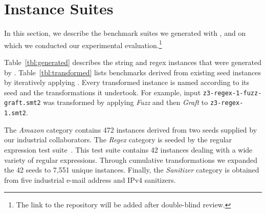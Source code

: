 \section{Instance Suites}
\label{sec:suites}

In this section, we describe the benchmark suites we generated
with \fuzzer{}, and on which we conducted our experimental
evaluation.\footnote{The link to the repository will be added after
double-blind review.}

Table~\ref{tbl:generated} describes the string and regex instances that were
generated by \generator{}. Table~\ref{tbl:transformed} lists benchmarks
derived from existing seed instances by iteratively applying \transformer{}.
Every transformed instance is named according to its
seed and the transformations it undertook. For example, input
\texttt{z3-regex-1-fuzz-graft.smt2} was transformed by applying
\textit{Fuzz} and then \textit{Graft} to \texttt{z3-regex-1.smt2}.

The \textit{Amazon} category contains 472 instances derived from two seeds
supplied by our industrial collaborators. The \textit{Regex} category is
seeded by the \usOld{} regular expression test suite~\cite{z3str2-tests}. This
test suite contains 42 instances dealing with a wide variety of regular
expressions. Through cumulative transformations we expanded the 42 seeds to 7,551 unique
instances. Finally, the \textit{Sanitizer} category is obtained from
five industrial e-mail address and IPv4 sanitizers.

